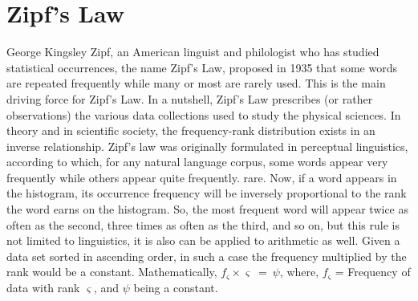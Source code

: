 \documentclass[conference]{IEEEtran}
\begin{document}
\section{Zipf's Law}
George Kingsley Zipf, an American linguist and philologist who has studied statistical occurrences, the name Zipf's Law, proposed in 1935 that some words are repeated frequently while many or most are rarely used. This is the main driving force for Zipf's Law. In a nutshell, Zipf's Law prescribes (or rather observations) the various  data collections used to study the physical sciences. In theory and in scientific society, the frequency-rank distribution exists in an inverse relationship. Zipf's law was originally formulated in perceptual linguistics, according to which, for any  natural language corpus, some words appear very frequently while others appear quite frequently. rare. Now, if a word appears in the histogram, its occurrence frequency  will be inversely proportional to the rank the word earns on the histogram. So, the most frequent word will appear twice as often as the second, three times as often as the third, and so on, but this rule is not limited to linguistics, it is also can be applied to arithmetic as well. Given a data set  sorted in ascending order, in such a case the frequency multiplied by the rank would be a constant. Mathematically, $f_\varsigma\times\varsigma\ =\ \psi$, where, $f_\varsigma$ = Frequency of data with rank $\varsigma$, and $\psi$ being a constant. 
\end{document}
